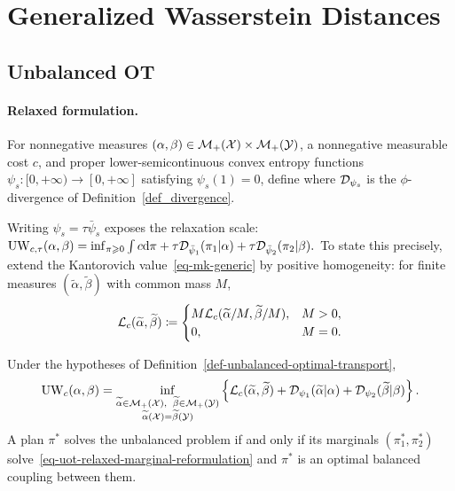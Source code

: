 \section{Generalized Wasserstein Distances}
\label{sec-extensions}
\label{sec-generalized-wasserstein-distances}
\subsection{Unbalanced OT}
\label{sec-unbalanced}
\paragraph{Relaxed formulation.}
\begin{defn}\label{def-unbalanced-optimal-transport}
For nonnegative measures $(\alpha,\beta) \in \mathcal{M}_+(\mathcal{X}) \times \mathcal{M}_+(\mathcal{Y})$, a nonnegative measurable cost $c$, and proper lower-semicontinuous convex entropy functions $\psi_s:[0,+\infty)\to[0,+\infty]$ satisfying $\psi_s(1)=0$, define
where $\mathcal{D}_{\psi_s}$ is the $\phi$-divergence of Definition~\ref{def_divergence}.
\end{defn}
Writing $\psi_s=\tau\bar\psi_s$ exposes the relaxation scale: \(\operatorname{UW}_{c,\tau}(\alpha,\beta) = \inf_{\pi\geqslant0} \int c\mathrm{d}\pi + \tau\mathcal{D}_{\bar\psi_1}(\pi_1|\alpha) + \tau\mathcal{D}_{\bar\psi_2}(\pi_2|\beta).\)
To state this precisely, extend the Kantorovich value~\eqref{eq-mk-generic} by positive homogeneity: for finite measures $(\widetilde\alpha,\widetilde\beta)$ with common mass $M$,
\begin{equation}\label{eq-finite-mass-kantorovich-extension}
\mathcal{L}_c(\widetilde\alpha,\widetilde\beta)
\coloneqq
\begin{cases}
M\mathcal{L}_c(\widetilde\alpha/M,\widetilde\beta/M),&M>0,\\
0,&M=0.
\end{cases}
\end{equation}
\begin{prop}\label{prop-uot-balanced-relaxed-marginals}
Under the hypotheses of Definition~\ref{def-unbalanced-optimal-transport},
\begin{equation}\label{eq-uot-relaxed-marginal-reformulation}
\UW_c(\alpha,\beta)
=
\inf_{\substack{\widetilde\alpha\in\Mm_+(\Xx),\ \,\widetilde\beta\in\Mm_+(\Yy)\\
\widetilde\alpha(\Xx)=\widetilde\beta(\Yy)}}
\left\{
\MK_c(\widetilde\alpha,\widetilde\beta)
+\Dd_{\psi_1}(\widetilde\alpha|\alpha)
+\Dd_{\psi_2}(\widetilde\beta|\beta)
\right\}.
\end{equation}
A plan $\pi^*$ solves the unbalanced problem if and only if its marginals $(\pi_1^*,\pi_2^*)$ solve~\eqref{eq-uot-relaxed-marginal-reformulation} and $\pi^*$ is an optimal balanced coupling between them.
\end{prop}
